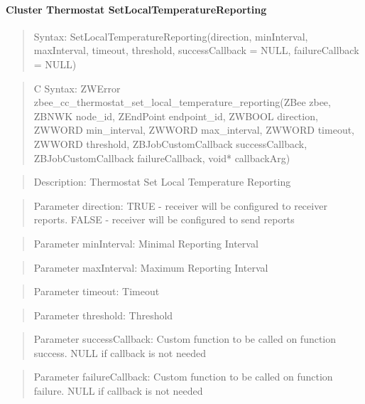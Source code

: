 \paragraph{Cluster Thermostat SetLocalTemperatureReporting}
\begin{quote}Syntax: SetLocalTemperatureReporting(direction, minInterval, maxInterval, timeout, threshold, successCallback = NULL, failureCallback = NULL)\end{quote}
\begin{quote}C Syntax: ZWError zbee\_cc\_thermostat\_set\_local\_temperature\_reporting(ZBee zbee, ZBNWK node\_id, ZEndPoint endpoint\_id, ZWBOOL direction, ZWWORD min\_interval, ZWWORD max\_interval, ZWWORD timeout, ZWWORD threshold, ZBJobCustomCallback successCallback, ZBJobCustomCallback failureCallback, void* callbackArg)\end{quote}
\begin{quote}Description: Thermostat Set Local Temperature Reporting\end{quote}
\begin{quote}Parameter direction: TRUE  - receiver will be configured to receiver reports. FALSE - receiver will be configured to send reports\end{quote}
\begin{quote}Parameter minInterval: Minimal Reporting Interval\end{quote}
\begin{quote}Parameter maxInterval: Maximum Reporting Interval\end{quote}
\begin{quote}Parameter timeout: Timeout\end{quote}
\begin{quote}Parameter threshold: Threshold\end{quote}
\begin{quote}Parameter successCallback: Custom function to be called on function success. NULL if callback is not needed\end{quote}
\begin{quote}Parameter failureCallback: Custom function to be called on function failure. NULL if callback is not needed\end{quote}


